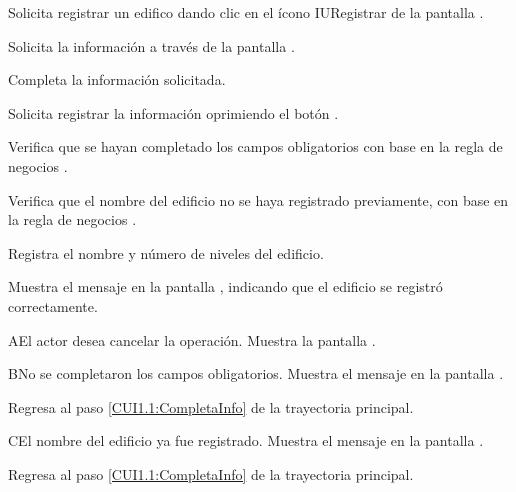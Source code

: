 \begin{UCtrayectoria}
	\UCpaso [\UCactor] Solicita registrar un edifico dando clic en el ícono IURegistrar de la pantalla . 
	
	\UCpaso[\UCsist] Solicita la información a través de la pantalla .
	
	\UCpaso [\UCactor] Completa la información solicitada. \label{CUI1.1:CompletaInfo}
	
	\UCpaso [\UCactor] Solicita registrar la información oprimiendo el botón . 
	
	\UCpaso [\UCsist] Verifica que se hayan completado los campos obligatorios con base en la regla de negocios . 
	
	\UCpaso [\UCsist] Verifica que el nombre del edificio no se haya registrado previamente, con base en la regla de negocios . 
			
	\UCpaso [\UCsist] Registra el nombre y número de niveles del edificio.
	
	\UCpaso [\UCsist] Muestra el mensaje  en la pantalla , indicando que el edificio se registró correctamente.	
	
\end{UCtrayectoria}

\begin{UCtrayectoriaA}{A}{El actor desea cancelar la operación.}
	\UCpaso [\UCsist] Muestra la pantalla . 
\end{UCtrayectoriaA}

\begin{UCtrayectoriaA}{B}{No se completaron los campos obligatorios.}
	\UCpaso [\UCsist] Muestra el mensaje  en la pantalla .
	
	\UCpaso Regresa al paso \ref{CUI1.1:CompletaInfo} de la trayectoria principal.
\end{UCtrayectoriaA}

\begin{UCtrayectoriaA}{C}{El nombre del edificio ya fue registrado.}
	\UCpaso [\UCsist] Muestra el mensaje  en la pantalla .
	
	\UCpaso Regresa al paso \ref{CUI1.1:CompletaInfo} de la trayectoria principal.
\end{UCtrayectoriaA}


